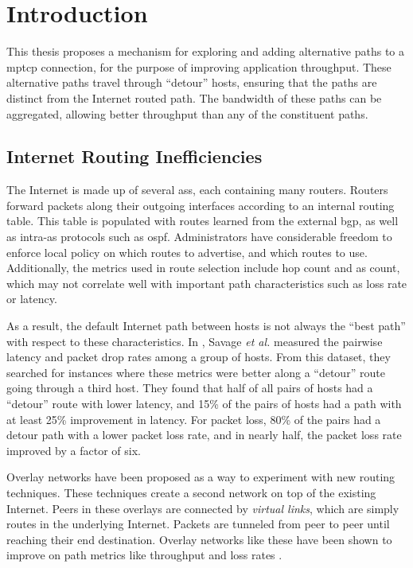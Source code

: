 \documentclass{cwru}
\begin{document}
\mainmatter
\chapter{Introduction}

This thesis proposes a mechanism for exploring and adding alternative paths to a
\ac{mptcp} connection, for the purpose of improving application throughput.
These alternative paths travel through ``detour'' hosts, ensuring that the paths
are distinct from the Internet routed path. The bandwidth of these paths can be
aggregated, allowing better throughput than any of the constituent paths.

\section{Internet Routing Inefficiencies}

The Internet is made up of several \acp{as}, each containing many routers.
Routers forward packets along their outgoing interfaces according to an internal
routing table. This table is populated with routes learned from the external
\ac{bgp}, as well as intra-\acs{as} protocols such as \ac{ospf}. Administrators
have considerable freedom to enforce local policy on which routes to advertise,
and which routes to use. Additionally, the metrics used in route selection
include hop count and \ac{as} count, which may not correlate well with important
path characteristics such as loss rate or latency.

As a result, the default Internet path between hosts is not always the ``best
path'' with respect to these characteristics. In \cite{detour}, Savage
\textit{et al.} measured the pairwise latency and packet drop rates among a
group of hosts. From this dataset, they searched for instances where these
metrics were better along a ``detour'' route going through a third host. They
found that half of all pairs of hosts had a ``detour'' route with lower latency,
and 15\% of the pairs of hosts had a path with at least 25\% improvement in
latency. For packet loss, 80\% of the pairs had a detour path with a lower
packet loss rate, and in nearly half, the packet loss rate improved by a factor
of six.

Overlay networks have been proposed as a way to experiment with new routing
techniques. These techniques create a second network on top of the existing
Internet. Peers in these overlays are connected by \textit{virtual links}, which
are simply routes in the underlying Internet. Packets are tunneled from peer to
peer until reaching their end destination. Overlay networks like these have been
shown to improve on path metrics like throughput and loss rates
\cite{detour,ron}.
\end{document}
